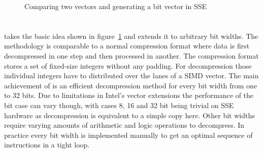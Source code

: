 \begin{figure}\center
{}
\caption{Comparing two vectors and generating a bit vector in SSE}
\label{fig:simplecomparesse}
\end{figure}

\section{\simdscan{}}

\simdscan{} \cite{SIMD-Scan} takes the basic idea shown in
figure~\ref{fig:simplecomparesse} and extends it to arbitrary bit widths. The
methodology is comparable to a normal compression format where data is first
decompressed in one step and then processed in another. The compression format
stores a set of fixed-size integers without any padding. For decompression those
individual integers have to distributed over the lanes of a SIMD vector. The
main achievement of \simdscan{} is an efficient decompression method for every
bit width from one to 32 bits. Due to limitations in Intel's vector extensions
the performance of the bit case can vary though, with cases 8, 16 and 32 bit
being trivial on SSE hardware as decompression is equivalent to a simple copy
here. Other bit widths require varying amounts of arithmetic and logic operations
to decompress. In practice every bit width is implemented manually to get an
optimal sequence of instructions in a tight loop.

